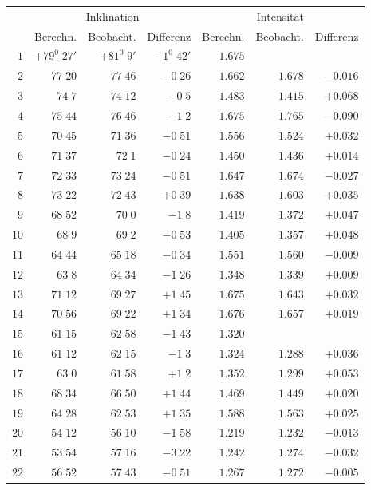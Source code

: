 \endgroup
\clearpage
{}
\begingroup
\fontsize{9}{10.2}\selectfont
\setlength{\tabcolsep}{1.5pt}
\renewcommand{\arraystretch}{1.02}
\begin{center}
\begin{tabular}{r||r|r|r||r|r|r}
\hline
&\multicolumn{3}{c||}{Inklination}&\multicolumn{3}{c}{Intensität}\\
&Berechn.&Beobacht.&Differenz&Berechn.&Beobacht.&Differenz\\\hline
$1$&$+79^0\;27'$&$+81^0\;9'$&$-1^0\;42'$&$1.675$&&\\
$2$&$77\;20$&$77\;46$&$-0\;26$&$1.662$&$1.678$&$-0.016$\\
$3$&$74\;7$&$74\;12$&$-0\;5$&$1.483$&$1.415$&$+0.068$\\
$4$&$75\;44$&$76\;46$&$-1\;2$&$1.675$&$1.765$&$-0.090$\\
$5$&$70\;45$&$71\;36$&$-0\;51$&$1.556$&$1.524$&$+0.032$\\
$6$&$71\;37$&$72\;1$&$-0\;24$&$1.450$&$1.436$&$+0.014$\\
$7$&$72\;33$&$73\;24$&$-0\;51$&$1.647$&$1.674$&$-0.027$\\
$8$&$73\;22$&$72\;43$&$+0\;39$&$1.638$&$1.603$&$+0.035$\\
$9$&$68\;52$&$70\;0$&$-1\;8$&$1.419$&$1.372$&$+0.047$\\
$10$&$68\;9$&$69\;2$&$-0\;53$&$1.405$&$1.357$&$+0.048$\\[2pt]
$11$&$64\;44$&$65\;18$&$-0\;34$&$1.551$&$1.560$&$-0.009$\\
$12$&$63\;8$&$64\;34$&$-1\;26$&$1.348$&$1.339$&$+0.009$\\
$13$&$71\;12$&$69\;27$&$+1\;45$&$1.675$&$1.643$&$+0.032$\\
$14$&$70\;56$&$69\;22$&$+1\;34$&$1.676$&$1.657$&$+0.019$\\
$15$&$61\;15$&$62\;58$&$-1\;43$&$1.320$&&\\
$16$&$61\;12$&$62\;15$&$-1\;3$&$1.324$&$1.288$&$+0.036$\\
$17$&$63\;0$&$61\;58$&$+1\;2$&$1.352$&$1.299$&$+0.053$\\
$18$&$68\;34$&$66\;50$&$+1\;44$&$1.469$&$1.449$&$+0.020$\\
$19$&$64\;28$&$62\;53$&$+1\;35$&$1.588$&$1.563$&$+0.025$\\
$20$&$54\;12$&$56\;10$&$-1\;58$&$1.219$&$1.232$&$-0.013$\\[2pt]
$21$&$53\;54$&$57\;16$&$-3\;22$&$1.242$&$1.274$&$-0.032$\\
$22$&$56\;52$&$57\;43$&$-0\;51$&$1.267$&$1.272$&$-0.005$\\

\end{tabular}
\end{center}
